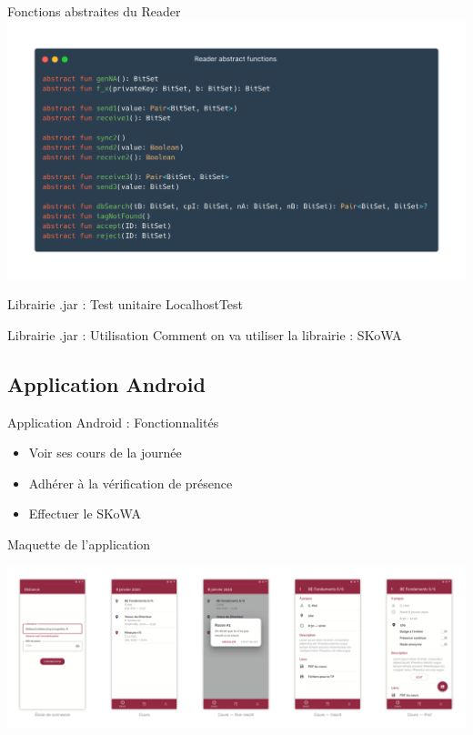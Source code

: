 \documentclass[aspectratio=169]{beamer}
\begin{document}
\begin{frame}{Fonctions abstraites du Reader}
  \centering
  \includegraphics[width=.95\linewidth]{../assets/readerAbs}
\end{frame}

\begin{frame}{Librairie .jar : Test unitaire}
  LocalhostTest
\end{frame}

\begin{frame}{Librairie .jar : Utilisation}
  Comment on va utiliser la librairie : SKoWA
\end{frame}

\subsection{Application Android}

\begin{frame}{Application Android : Fonctionnalités}
  
  \begin{itemize}
    \item Voir ses cours de la journée
    \item Adhérer à la vérification de présence
    \item Effectuer le SKoWA
  \end{itemize}

\end{frame}

\begin{frame}{Maquette de l'application}
  \begin{adjustwidth}{-1.8em}{2em}
    \centering
    \includegraphics[width=1.1\linewidth]{../assets/maquette.png}
  \end{adjustwidth}
\end{frame}
\end{document}
